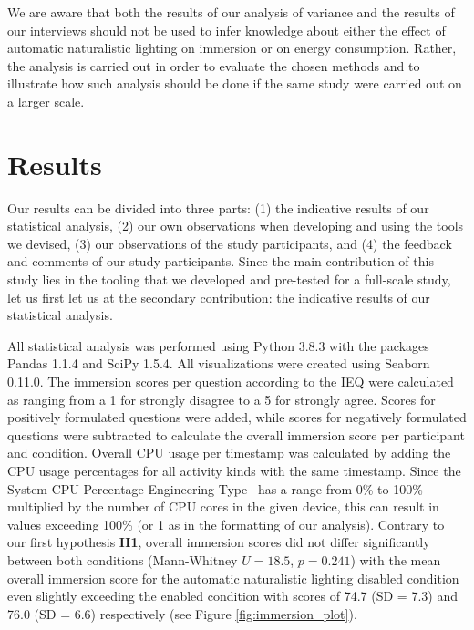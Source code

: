 \documentclass[12pt,twoside,english]{article}
\begin{document}
We are aware that both the results of our analysis of variance and the results of our interviews should not be used to infer knowledge about either the effect of automatic naturalistic lighting on immersion or on energy consumption.
Rather, the analysis is carried out in order to evaluate the chosen methods and to illustrate how such analysis should be done if the same study were carried out on a larger scale.


\section{Results}
\label{sect:results}

Our results can be divided into three parts: (1) the indicative results of our statistical analysis, (2) our own observations when developing and using the tools we devised, (3) our observations of the study participants, and (4) the feedback and comments of our study participants.
Since the main contribution of this study lies in the tooling that we developed and pre-tested for a full-scale study, let us first let us at the secondary contribution: the indicative results of our statistical analysis.

All statistical analysis was performed using Python 3.8.3 with the packages Pandas 1.1.4 and SciPy 1.5.4.
All visualizations were created using Seaborn 0.11.0.
The immersion scores per question according to the \gls{IEQ} were calculated as ranging from a 1 for strongly disagree to a 5 for strongly agree.
Scores for positively formulated questions were added, while scores for negatively formulated questions were subtracted to calculate the overall immersion score per participant and condition.
Overall \gls{CPU} usage per timestamp was calculated by adding the \gls{CPU} usage percentages for all activity kinds with the same timestamp.
Since the System CPU Percentage Engineering Type~\cite{apple_system_2020} has a range from 0\% to 100\% multiplied by the number of \gls{CPU} cores in the given device, this can result in values exceeding 100\% (or 1 as in the formatting of our analysis).
Contrary to our first hypothesis \textbf{H1}, overall immersion scores did not differ significantly between both conditions (Mann-Whitney $ U = 18.5 $, $ p = 0.241 $) with the mean overall immersion score for the automatic naturalistic lighting disabled condition even slightly exceeding the enabled condition with scores of 74.7 (SD = 7.3) and 76.0 (SD = 6.6) respectively (see Figure \ref{fig:immersion_plot}).
\end{document}

